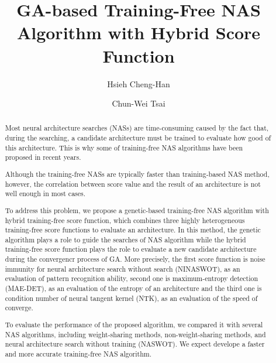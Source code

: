 \documentclass[sigconf]{acmart}
\begin{document}
\title{GA-based Training-Free NAS Algorithm with Hybrid Score Function}

\author{Hsieh Cheng-Han}

\author{Chun-Wei Tsai}

\begin{abstract}

    Most neural architecture searches (NASs) are time-consuming caused by 
    the fact that, during the searching, a candidate architecture must be 
    trained to evaluate how good of this architecture. This is why some of 
    training-free NAS algorithms have been proposed in recent years.

    Although the training-free NASs are typically faster than training-based 
    NAS method, however, the correlation between score value and the result 
    of an architecture is not well enough in most cases.
    
    To address this problem, we propose a genetic-based training-free NAS 
    algorithm with hybrid training-free score function, which combines three 
    highly heterogeneous training-free score functions to evaluate an architecture. 
    In this method, the genetic algorithm plays a role to guide the searches 
    of NAS algorithm while the hybrid training-free score function plays the 
    role to evaluate a new candidate architecture during the convergencr process 
    of GA. More precisely, the first score function is noise immunity for 
    neural architecture search without search (NINASWOT), as an evaluation of 
    pattern recognition ability, second one is maximum-entropy detection (MAE-DET), 
    as an evaluation of the entropy of an architecture and the third one is 
    condition number of neural tangent kernel (NTK), as an evaluation of 
    the speed of converge.
    
    To evaluate the performance of the proposed algorithm, we compared it 
    with several NAS algorithms, including weight-sharing methods, 
    non-weight-sharing methods, and neural architecture search without training (NASWOT). 
    We expect develope a faster and more accurate training-free NAS algorithm.

\end{abstract}
\maketitle
\end{document}
